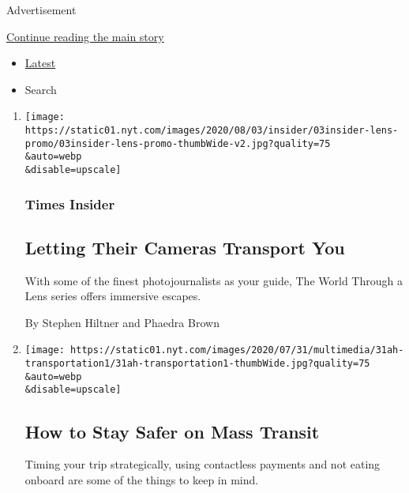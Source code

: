 Advertisement

\protect\hyperlink{after-mid2}{Continue reading the main story}

\begin{itemize}
\tightlist
\item
  \protect\hyperlink{stream-panel}{Latest}
\item
  Search
\end{itemize}

\begin{enumerate}
\def\labelenumi{\arabic{enumi}.}
\item
  \href{/2020/08/03/insider/letting-their-cameras-transport-you.html}{}

  \texttt{[image: https://static01.nyt.com/images/2020/08/03/insider/03insider-lens-promo/03insider-lens-promo-thumbWide-v2.jpg?quality=75\\\&auto=webp\\\&disable=upscale]}

  \hypertarget{times-insider}{%
  \subsubsection{Times Insider}\label{times-insider}}

  \hypertarget{letting-their-cameras-transport-you}{%
  \subsection{Letting Their Cameras Transport
  You}\label{letting-their-cameras-transport-you}}

  With some of the finest photojournalists as your guide, The World
  Through a Lens series offers immersive escapes.

  By Stephen Hiltner and Phaedra Brown
\item
  \href{/2020/08/01/at-home/coronavirus-public-transportation-subway.html}{}

  \texttt{[image: https://static01.nyt.com/images/2020/07/31/multimedia/31ah-transportation1/31ah-transportation1-thumbWide.jpg?quality=75\\\&auto=webp\\\&disable=upscale]}

  \hypertarget{how-to-stay-safer-on-mass-transit}{%
  \subsection{How to Stay Safer on Mass
  Transit}\label{how-to-stay-safer-on-mass-transit}}

  Timing your trip strategically, using contactless payments and not
  eating onboard are some of the things to keep in mind.


\end{enumerate}
